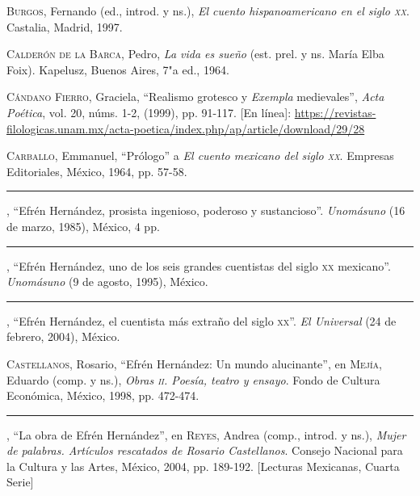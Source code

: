 \documentclass[14pt,twoside,final]{extbook} %
\begin{document}
\textsc{Burgos}, Fernando (ed., introd. y ns.), \emph{El cuento hispanoamericano en el siglo \textsc{xx}}. Castalia, Madrid, 1997.\label{bib:burgos1997}

\textsc{Calderón de la Barca}, Pedro, \emph{La vida es sueño} (est. prel. y ns. María Elba Foix). Kapelusz, Buenos Aires, 7"a ed., 1964.\label{bib:calderon1964}

\textsc{Cándano Fierro}, Graciela, ``Realismo grotesco y \emph{Exempla} medievales'', \emph{Acta Poética}, vol. 20, núms. 1-2, (1999), pp. 91-117. [En línea]: \href{https://revistas-filologicas.unam.mx/acta-poetica/index.php/ap/article/download/29/28}{https://revistas-filologicas.unam.mx/acta-poetica/index.php/ap/article/download/29/28}\label{bib:candano1999}

\textsc{Carballo}, Emmanuel, ``Prólogo'' a \emph{El cuento mexicano del siglo \textsc{xx}}. Empresas Editoriales, México, 1964, pp. 57-58.\label{bib:carballo1964}

\rule{1cm}{0.4pt}, ``Efrén Hernández, prosista ingenioso, poderoso y sustancioso''. \emph{Unomásuno} (16 de marzo, 1985), México, 4 pp.\label{bib:carballo1985}

\rule{1cm}{0.4pt}, ``Efrén Hernández, uno de los seis grandes cuentistas del siglo \textsc{xx} mexicano''. \emph{Unomásuno} (9 de agosto, 1995), México.\label{bib:carballo1995}

\rule{1cm}{0.4pt}, ``Efrén Hernández, el cuentista más extraño del siglo \textsc{xx}''. \emph{El Universal} (24 de febrero, 2004), México.\label{bib:carballo2004}

\textsc{Castellanos}, Rosario, ``Efrén Hernández: Un mundo alucinante'', en \textsc{Mejía}, Eduardo (comp. y ns.), \emph{Obras \textsc{ii}. Poesía, teatro y ensayo}. Fondo de Cultura Económica, México, 1998, pp. 472-474.\label{bib:castellanos1998}

\rule{1cm}{0.4pt}, ``La obra de Efrén Hernández'', en \textsc{Reyes}, Andrea (comp., introd. y ns.), \emph{Mujer de palabras. Artículos rescatados de Rosario Castellanos}. Consejo Nacional para la Cultura y las Artes, México, 2004, pp. \mbox{189-192}. [Lecturas Mexicanas, Cuarta Serie]\label{bib:castellanos2004}
\end{document}
